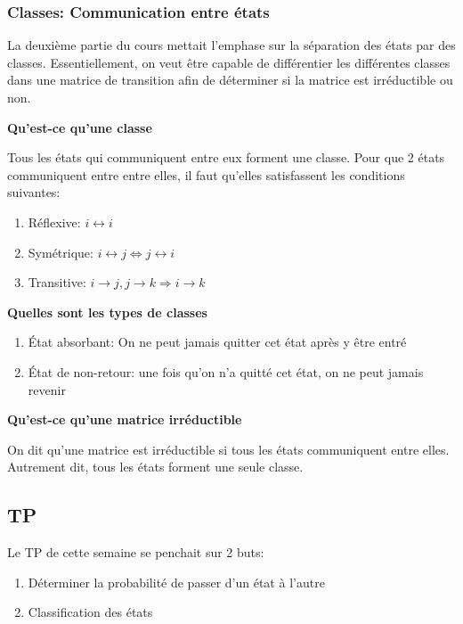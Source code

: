 \documentclass{article}
\begin{document}
\subsubsection{Classes: Communication entre états}

La deuxième partie du cours mettait l'emphase sur la séparation des
états par des classes. Essentiellement, on veut être capable de
différentier les différentes classes dans une matrice de transition
afin de déterminer si la matrice est irréductible ou non.

\textbf{Qu'est-ce qu'une classe}

Tous les états qui communiquent entre eux forment une classe. Pour que
2 états communiquent entre entre elles, il faut qu'elles satisfassent
les conditions suivantes:
\begin{enumerate}
    \item Réflexive: $ i \leftrightarrow i$
    \item Symétrique: $ i \leftrightarrow j \Longleftrightarrow j
	\leftrightarrow i $
    \item Transitive: $ i \to j, j \to k \Longrightarrow i \to k $
\end{enumerate}

\textbf{Quelles sont les types de classes}

\begin{enumerate}
    \item État absorbant: On ne peut jamais quitter cet état après y
	être entré
    \item État de non-retour: une fois qu'on n'a quitté cet état,
	on ne peut jamais revenir
\end{enumerate}

\textbf{Qu'est-ce qu'une matrice irréductible}

On dit qu'une matrice est irréductible si tous les états communiquent
entre elles. Autrement dit, tous les états forment une seule classe.

\subsection{TP}

Le TP de cette semaine se penchait sur 2 buts:
\begin{enumerate}
    \item Déterminer la probabilité de passer d'un état à l'autre
    \item Classification des états
\end{enumerate}
\end{document}
